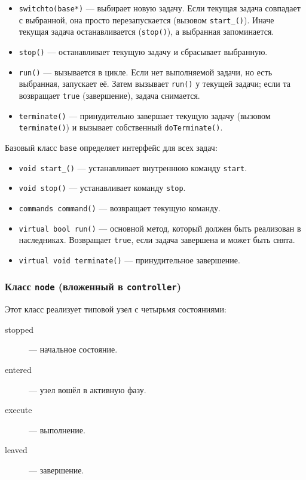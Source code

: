 \documentclass[a4paper,12pt]{article}
\begin{document}
\begin{itemize}
    \item \texttt{switchto(base*)} — выбирает новую задачу. Если текущая задача совпадает с выбранной, она просто перезапускается (вызовом \texttt{start\_()}). Иначе текущая задача останавливается (\texttt{stop()}), а выбранная запоминается.
    \item \texttt{stop()} — останавливает текущую задачу и сбрасывает выбранную.
    \item \texttt{run()} — вызывается в цикле. Если нет выполняемой задачи, но есть выбранная, запускает её. Затем вызывает \texttt{run()} у текущей задачи; если та возвращает \texttt{true} (завершение), задача снимается.
    \item \texttt{terminate()} — принудительно завершает текущую задачу (вызовом \texttt{terminate()}) и вызывает собственный \texttt{doTerminate()}.
\end{itemize}

Базовый класс \texttt{base} определяет интерфейс для всех задач:

\begin{itemize}
    \item \texttt{void start\_()} — устанавливает внутреннюю команду \texttt{start}.
    \item \texttt{void stop()} — устанавливает команду \texttt{stop}.
    \item \texttt{commands command()} — возвращает текущую команду.
    \item \texttt{virtual bool run()} — основной метод, который должен быть реализован в наследниках. Возвращает \texttt{true}, если задача завершена и может быть снята.
    \item \texttt{virtual void terminate()} — принудительное завершение.
\end{itemize}

\subsubsection{Класс \texttt{node} (вложенный в \texttt{controller})}

Этот класс реализует типовой узел с четырьмя состояниями:

\begin{description}
    \item[stopped] — начальное состояние.
    \item[entered] — узел вошёл в активную фазу.
    \item[execute] — выполнение.
    \item[leaved] — завершение.
\end{description}
\end{document}
